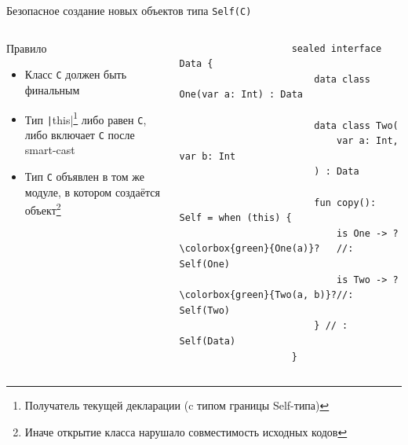 \documentclass[usenames, dvipsnames]{beamer}
\begin{document}
    \begin{frame}[fragile]{Безопасное создание новых объектов типа \texttt{Self(C)}}
        \begin{columns}[onlytextwidth]
            \begin{column}[t]{0.46\textwidth}
                \begin{block}{Правило}
                    \begin{itemize}
                        \item Класс \texttt{C} должен быть финальным
                        \item Тип \texttt|this|\footnote{Получатель текущей декларации (c типом границы Self-типа)} либо равен \texttt{С}, либо включает \texttt{C} после smart-cast
                        \item Тип \texttt{C} объявлен в том же модуле, в котором создаётся объект\footnote{Иначе открытие класса нарушало совместимость исходных кодов}
                    \end{itemize}
                \end{block}
            \end{column}\hfill%
            \begin{column}[t]{0.50\textwidth}
                \begin{verbatim}
                    sealed interface Data {
                        data class One(var a: Int) : Data

                        data class Two(
                            var a: Int, var b: Int
                        ) : Data

                        fun copy(): Self = when (this) {
                            is One -> ?\colorbox{green}{One(a)}?   //: Self(One)
                            is Two -> ?\colorbox{green}{Two(a, b)}?//: Self(Two)
                        } // : Self(Data)
                    }
                \end{verbatim}
            \end{column}
        \end{columns}
    \end{frame}
\end{document}
